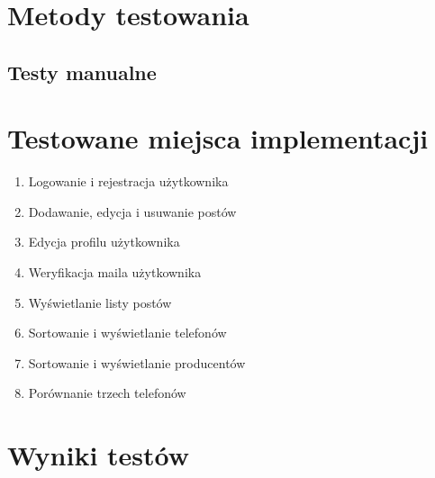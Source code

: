 \section{Metody testowania}

\subsection{Testy manualne}


\section{Testowane miejsca implementacji}


\begin{enumerate}
  \item Logowanie i rejestracja użytkownika
  \item Dodawanie, edycja i usuwanie postów
  \item Edycja profilu użytkownika
  \item Weryfikacja maila użytkownika
  \item Wyświetlanie listy postów
  \item Sortowanie i wyświetlanie telefonów
  \item Sortowanie i wyświetlanie producentów
  \item Porównanie trzech telefonów
\end{enumerate}


\section{Wyniki testów}


